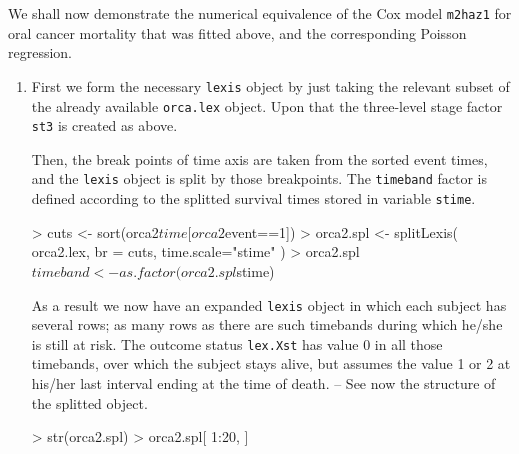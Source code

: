 We shall now demonstrate the numerical equivalence of the Cox model
{\tt m2haz1} for oral cancer mortality that was fitted above,
 and the corresponding Poisson regression.


\begin{enumerate}

\item
 First we form the necessary {\tt lexis} object by just taking
 the relevant subset of the already available {\tt orca.lex} object.
 Upon that the three-level stage factor {\tt st3} is created
 as above.
\begin{Schunk}
\end{Schunk}
 Then, the break points of time axis are taken from
 the sorted event times, and the {\tt lexis} object is
 split by those breakpoints. The {\tt timeband} factor
 is defined according to the splitted survival times
 stored in variable {\tt stime}.

\begin{Schunk}
\begin{Sinput}
> cuts <- sort(orca2$time[orca2$event==1])
> orca2.spl <- splitLexis( orca2.lex, br = cuts, time.scale="stime" )
> orca2.spl$timeband <- as.factor(orca2.spl$stime)
\end{Sinput}
\end{Schunk}

As a result we now have an expanded
 {\tt lexis} object in which each subject has several rows;
 as many rows as there are such timebands
 during which he/she is still at risk.
 The outcome status \verb|lex.Xst| has value 0 in all those
 timebands, over which the subject stays alive, but assumes
 the value 1 or 2 at his/her last interval ending at the time of death.
 -- See now the structure of the splitted object.

\begin{Schunk}
\begin{Sinput}
> str(orca2.spl)
> orca2.spl[ 1:20, ]
\end{Sinput}
\end{Schunk}



\end{enumerate}
